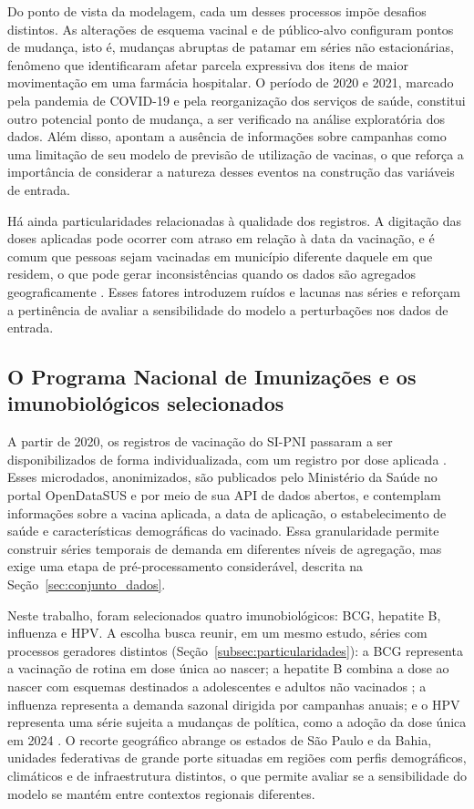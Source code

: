 \documentclass[
    12pt,                %
    openright,           %
    oneside,             %
    a4paper,             %
    english,             %
    brazil               %
]{abntex2}
\begin{document}
Do ponto de vista da modelagem, cada um desses processos impõe desafios distintos. As alterações de esquema vacinal e de público-alvo configuram pontos de mudança, isto é, mudanças abruptas de patamar em séries não estacionárias, fenômeno que  identificaram afetar parcela expressiva dos itens de maior movimentação em uma farmácia hospitalar. O período de 2020 e 2021, marcado pela pandemia de COVID-19 e pela reorganização dos serviços de saúde, constitui outro potencial ponto de mudança, a ser verificado na análise exploratória dos dados. Além disso,  apontam a ausência de informações sobre campanhas como uma limitação de seu modelo de previsão de utilização de vacinas, o que reforça a importância de considerar a natureza desses eventos na construção das variáveis de entrada.

Há ainda particularidades relacionadas à qualidade dos registros. A digitação das doses aplicadas pode ocorrer com atraso em relação à data da vacinação, e é comum que pessoas sejam vacinadas em município diferente daquele em que residem, o que pode gerar inconsistências quando os dados são agregados geograficamente \cite{Lopes2022}. Esses fatores introduzem ruídos e lacunas nas séries e reforçam a pertinência de avaliar a sensibilidade do modelo a perturbações nos dados de entrada.

\subsection{O Programa Nacional de Imunizações e os imunobiológicos selecionados}
\label{subsec:pni}

A partir de 2020, os registros de vacinação do SI-PNI passaram a ser disponibilizados de forma individualizada, com um registro por dose aplicada \cite{BrasilPNIDados}. Esses microdados, anonimizados, são publicados pelo Ministério da Saúde no portal OpenDataSUS e por meio de sua API de dados abertos, e contemplam informações sobre a vacina aplicada, a data de aplicação, o estabelecimento de saúde e características demográficas do vacinado. Essa granularidade permite construir séries temporais de demanda em diferentes níveis de agregação, mas exige uma etapa de pré-processamento considerável, descrita na Seção~\ref{sec:conjunto_dados}.

Neste trabalho, foram selecionados quatro imunobiológicos: BCG, hepatite B, influenza e HPV. A escolha busca reunir, em um mesmo estudo, séries com processos geradores distintos (Seção~\ref{subsec:particularidades}): a BCG representa a vacinação de rotina em dose única ao nascer; a hepatite B combina a dose ao nascer com esquemas destinados a adolescentes e adultos não vacinados \cite{BrasilCalendario2026}; a influenza representa a demanda sazonal dirigida por campanhas anuais; e o HPV representa uma série sujeita a mudanças de política, como a adoção da dose única em 2024 \cite{BrasilNT412024}. O recorte geográfico abrange os estados de São Paulo e da Bahia, unidades federativas de grande porte situadas em regiões com perfis demográficos, climáticos e de infraestrutura distintos, o que permite avaliar se a sensibilidade do modelo se mantém entre contextos regionais diferentes.
\end{document}
